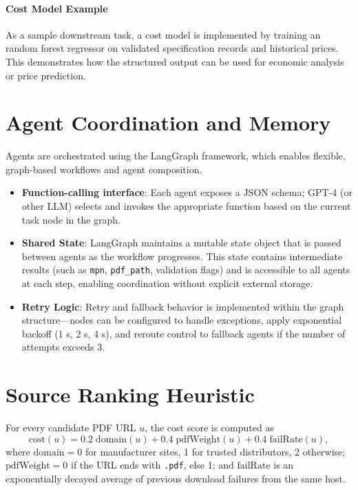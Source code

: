 \paragraph{Cost Model Example}  
As a sample downstream task, a cost model is implemented by training an random forest regressor on validated specification records and historical prices. This demonstrates how the structured output can be used for economic analysis or price prediction.

\section{Agent Coordination and Memory}
Agents are orchestrated using the LangGraph framework, which enables flexible, graph-based workflows and agent composition.  
\begin{itemize}
  \item \textbf{Function-calling interface}: Each agent exposes a JSON schema; GPT-4 (or other LLM) selects and invokes the appropriate function based on the current task node in the graph.
  \item \textbf{Shared State}: LangGraph maintains a mutable state object that is passed between agents as the workflow progresses. This state contains intermediate results (such as \verb|mpn|, \verb|pdf_path|, validation flags) and is accessible to all agents at each step, enabling coordination without explicit external storage.
  \item \textbf{Retry Logic}: Retry and fallback behavior is implemented within the graph structure—nodes can be configured to handle exceptions, apply exponential backoff (1 s, 2 s, 4 s), and reroute control to fallback agents if the number of attempts exceeds 3.
\end{itemize}

\section{Source Ranking Heuristic}
For every candidate PDF URL $u$, the cost score is computed as
\begin{equation}
\label{eq:heuristic}
\mathrm{cost}(u)=0.2\;\mathrm{domain}(u)+0.4\;\mathrm{pdfWeight}(u)+0.4\;\mathrm{failRate}(u),
\end{equation}
where \(\mathrm{domain}=0\) for manufacturer sites, 1 for trusted distributors, 2 otherwise;  
\(\mathrm{pdfWeight}=0\) if the URL ends with \texttt{.pdf}, else 1;  
and \(\mathrm{failRate}\) is an exponentially decayed average of previous download failures from the same host.

